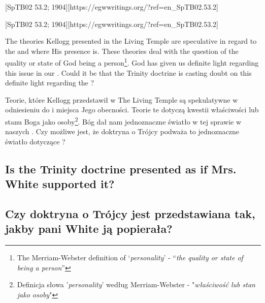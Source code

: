 [SpTB02 53.2; 1904][https://egwwritings.org/?ref=en\_SpTB02.53.2]


[SpTB02 53.2; 1904][https://egwwritings.org/?ref=en\_SpTB02.53.2]


The theories Kellogg presented in the Living Temple are speculative in regard to the  and where His presence is. These theories deal with the question of the quality or state of God being a person\footnote{The Merriam-Webster definition of ‘\textit{personality}’ - “\textit{the quality or state of being a person}”}. God has given us definite light regarding this issue in our . Could it be that the Trinity doctrine is casting doubt on this definite light regarding the ?


Teorie, które Kellogg przedstawił w The Living Temple są spekulatywne w odniesieniu do  i miejsca Jego obecności. Teorie te dotyczą kwestii właściwości lub stanu Boga jako osoby\footnote{Definicja słowa '\textit{personality}' według Merriam-Webster - "\textit{właściwość lub stan jako osoby}"}. Bóg dał nam jednoznaczne światło w tej sprawie w naszych . Czy możliwe jest, że doktryna o Trójcy podważa to jednoznaczne światło dotyczące ?


\subsection*{Is the Trinity doctrine presented as if Mrs. White supported it?}


\subsection*{Czy doktryna o Trójcy jest przedstawiana tak, jakby pani White ją popierała?}


